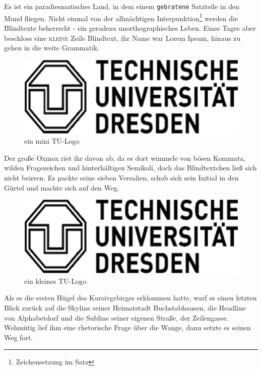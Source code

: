 \documentclass[%
	12pt,%
	a4paper,%
	oneside,%
 liststotoc, idxtotoc, bibtotoc, %
	halfparskip,%
	nochapterprefix,%
	appendixprefix, %
smallheadings,%
]{scrreprt}
\newcommand{\alt}[1]{}%
\begin{document}
Es ist ein paradiesmatisches Land, in dem einem \texttt{gebratene} Satzteile in den Mund fliegen. Nicht einmal von der allmächtigen Interpunktion\footnote{Zeichensetzung im Satz} werden die Blindtexte beherrscht - ein geradezu unorthographisches Leben. Eines Tages aber beschloss eine \textsc{kleine} Zeile Blindtext, ihr Name war Lorem Ipsum, hinaus zu gehen in die weite Grammatik.

\begin{figure}[htbp]
		\centering
		\alt{Ich bin das Logo der Technischen Universität Dresden}
		\includegraphics[scale=0.10]{images/tu_logo}%
	\caption[kurz]{ein mini TU-Logo}%
	\label{fig:minitulogo}
\end{figure}

Der große Oxmox riet ihr davon ab, da es dort wimmele von bösen Kommata, wilden Fragezeichen und hinterhältigen Semikoli, doch das Blindtextchen ließ sich nicht beirren. Es packte seine sieben Versalien, schob sich sein Initial in den Gürtel und machte sich auf den Weg. 

\begin{figure}[htbp]
		\centering
		\alt{Ich bin das Logo der Technischen Universität Dresden}
		\includegraphics[scale=0.25]{images/tu_logo}%
	\caption{ein kleines TU-Logo}%
	\label{fig:kleinestulogo}
\end{figure}

Als es die ersten Hügel des Kursivgebirges erklommen hatte, warf es einen letzten Blick zurück auf die Skyline seiner Heimatstadt Buchstabhausen, die Headline von Alphabetdorf und die Subline seiner eigenen Straße, der Zeilengasse. Wehmütig lief ihm eine rhetorische Frage über die Wange, dann setzte es seinen Weg fort.
\end{document}

